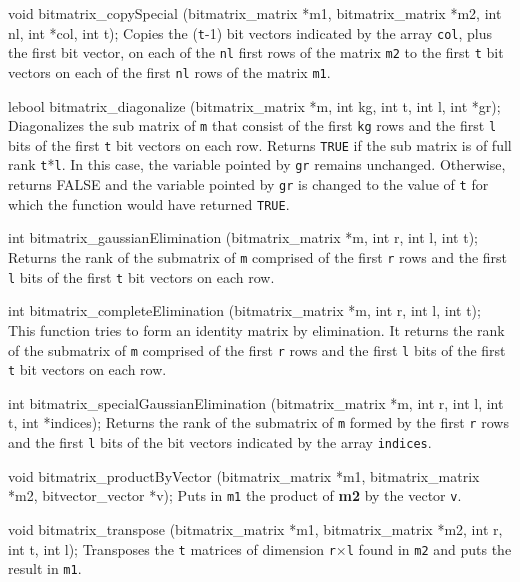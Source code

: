 void bitmatrix_copySpecial (bitmatrix_matrix *m1, bitmatrix_matrix *m2, 
                            int nl, int *col, int t);
\endcode
 \tab
Copies the ({\tt t}-1) bit vectors indicated by the array {\tt col}, 
plus the first bit vector, on each of the {\tt nl} first rows of the matrix 
{\tt m2} to the first {\tt t} bit vectors
on each of the first {\tt nl} rows of the matrix {\tt m1}.
 \endtab
\code

lebool bitmatrix_diagonalize (bitmatrix_matrix *m, int kg, int t, int l, int *gr);
\endcode
\tab
Diagonalizes the sub matrix of {\tt m} that consist of the first {\tt kg} rows 
and the first {\tt l} bits of the first {\tt t} bit vectors on each row.
Returns {\tt TRUE} if the sub matrix is of full rank {\tt t}*{\tt l}.  
In this case, the variable pointed by {\tt gr} remains unchanged.  
Otherwise, returns FALSE and the variable pointed by {\tt gr} is changed 
to the value of {\tt t} for which the function would have returned {\tt TRUE}.
 \endtab
\code

int bitmatrix_gaussianElimination (bitmatrix_matrix *m, int r, int l, int t);
\endcode
 \tab
Returns the rank of the submatrix of {\tt m} comprised of the first {\tt r} rows 
and the first {\tt l} bits of the first {\tt t} bit vectors on each row.
 \endtab
\code

int bitmatrix_completeElimination (bitmatrix_matrix *m, int r, int l, int t);
\endcode
 \tab
This function tries to form an identity matrix by elimination. 
It returns the rank of the submatrix of {\tt m} comprised of the first 
{\tt r} rows and the first {\tt l} bits of the first {\tt t} bit vectors on each row.
 \endtab
\code

int bitmatrix_specialGaussianElimination (bitmatrix_matrix *m, 
                                          int r, int l, int t, int *indices);
\endcode
 \tab
Returns the rank of the submatrix of {\tt m} formed by the first {\tt r} rows 
and the first {\tt l} bits of the bit vectors indicated by the array {\tt indices}.
 \endtab
\code

void bitmatrix_productByVector (bitmatrix_matrix *m1, bitmatrix_matrix *m2, 
                                bitvector_vector *v);
\endcode
\tab
Puts in {\tt m1} the product of {\bf m2} by the vector {\tt v}.
\endtab
\code

void bitmatrix_transpose (bitmatrix_matrix *m1, bitmatrix_matrix *m2, 
                          int r, int t, int l);
\endcode
 \tab
Transposes the {\tt t} matrices of dimension {\tt r}$\times${\tt l} 
found in {\tt m2} and puts the result in {\tt m1}.
 \endtab
\code

